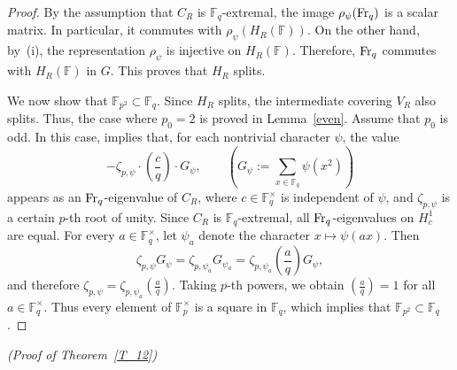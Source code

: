 \documentclass[12pt,a4paper]{amsart}
\theoremstyle{definition}
\def\F{{\mathbb F}}
\theoremstyle{remark}
\begin{document}
\begin{proof}
By the assumption that $C_R$ is $\F_q$-extremal, the image $\rho_\psi({\rm Fr}_q)$ is a scalar matrix. In particular, it commutes with $\rho_\psi(H_R(\F))$. On the other hand, by~(i), the representation $\rho_\psi$ is injective on $H_R(\F)$. Therefore, ${\rm Fr}_q$ commutes with $H_R(\F)$ in $G$. This proves that $H_R$ splits. 

We now show that $\F_{p^2}\subset \F_q$. Since $H_R$ splits, the intermediate covering $V_R$ also splits. Thus, the case where $p_0=2$ is proved in Lemma~\ref{even}. Assume that $p_0$ is odd. In this case,  \cite[Corollary~A.8]{TT} implies that, for each nontrivial character $\psi$, the value 
\[
-\zeta_{p,\psi} \cdot \left(\frac{c}{q}\right)\cdot  G_\psi, \qquad(G_\psi:=\sum_{x\in \F_q}\psi(x^2))
\]
appears as an ${\rm Fr}_q$-eigenvalue of $C_R$, where $c\in \F_q^\times$ is independent of $\psi$, and $\zeta_{p,\psi}$ is a certain $p$-th root of unity. 
Since $C_R$ is $\F_q$-extremal, all ${\rm Fr}_q$-eigenvalues on $H_c^1$ are equal. For every $a\in \F_q^\times$, let $\psi_a$ denote the character $x\mapsto \psi(ax)$. Then 
\[
\zeta_{p,\psi} G_\psi=\zeta_{p,\psi_a} G_{\psi_a}=\zeta_{p,\psi_a}\left(\frac{a}{q}\right) G_{\psi}, 
\]
and therefore $\zeta_{p,\psi}=\zeta_{p,\psi_a}(\frac{a}{q})$. Taking $p$-th powers, we obtain $(\frac{a}{q})=1$ for all $a\in\F_q^\times$. Thus every element of $\F_p^\times$ is a square in $\F_q$, which implies that $\F_{p^2}\subset\F_q$. 
\end{proof}

\medskip 

\noindent\textit{(Proof of Theorem~\ref{T_12})}
\end{document}
